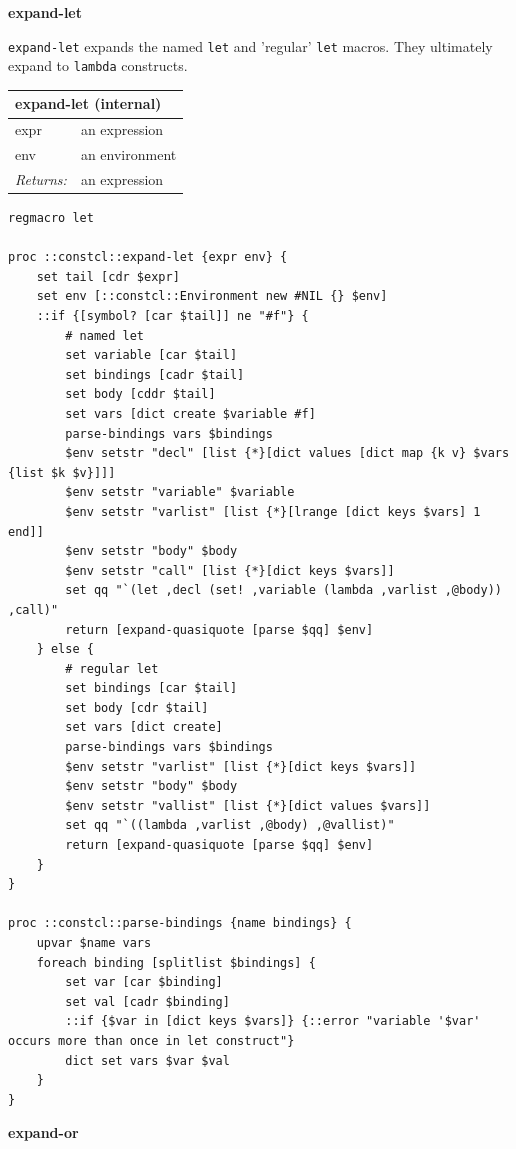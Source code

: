 \documentclass[twoside,9pt]{report}
\begin{document}
\textbf{expand-let}


\texttt{expand-let} expands the named \texttt{let} and 'regular' \texttt{let} macros. They ultimately expand to \texttt{lambda} constructs.

\begin{tabular}{ |l l| }
\hline
\multicolumn{2}{|l|}{expand-let (internal)} \\
\hline
expr & an expression \\
env & an environment \\
\textit{Returns:} & an expression \\
\hline
\end{tabular}

\noindent\makebox[\linewidth]{\rule{\linewidth}{0.4pt}}
\begin{lstlisting}
regmacro let
 
proc ::constcl::expand-let {expr env} {
    set tail [cdr $expr]
    set env [::constcl::Environment new #NIL {} $env]
    ::if {[symbol? [car $tail]] ne "#f"} {
        # named let
        set variable [car $tail]
        set bindings [cadr $tail]
        set body [cddr $tail]
        set vars [dict create $variable #f]
        parse-bindings vars $bindings
        $env setstr "decl" [list {*}[dict values [dict map {k v} $vars {list $k $v}]]]
        $env setstr "variable" $variable
        $env setstr "varlist" [list {*}[lrange [dict keys $vars] 1 end]]
        $env setstr "body" $body
        $env setstr "call" [list {*}[dict keys $vars]]
        set qq "`(let ,decl (set! ,variable (lambda ,varlist ,@body)) ,call)"
        return [expand-quasiquote [parse $qq] $env]
    } else {
        # regular let
        set bindings [car $tail]
        set body [cdr $tail]
        set vars [dict create]
        parse-bindings vars $bindings
        $env setstr "varlist" [list {*}[dict keys $vars]]
        $env setstr "body" $body
        $env setstr "vallist" [list {*}[dict values $vars]]
        set qq "`((lambda ,varlist ,@body) ,@vallist)"
        return [expand-quasiquote [parse $qq] $env]
    }
}
 
proc ::constcl::parse-bindings {name bindings} {
    upvar $name vars
    foreach binding [splitlist $bindings] {
        set var [car $binding]
        set val [cadr $binding]
        ::if {$var in [dict keys $vars]} {::error "variable '$var' occurs more than once in let construct"}
        dict set vars $var $val
    }
}
\end{lstlisting}
\noindent\makebox[\linewidth]{\rule{\linewidth}{0.4pt}}

\textbf{expand-or}
\end{document}
